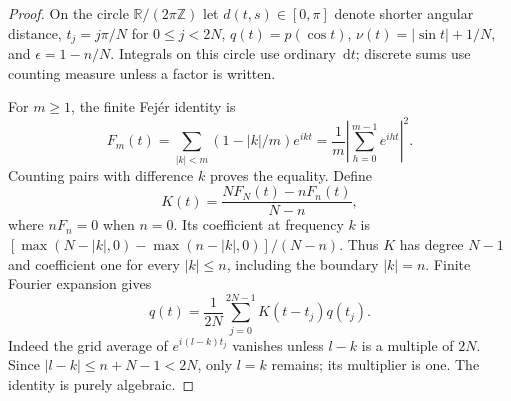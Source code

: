 \documentclass{siamart251216}
\newcommand{\R}{\mathbb R}
\newcommand{\dd}{\,\mathrm d}
\begin{document}
\begin{proof}
On the circle $\R/(2\pi\mathbb Z)$ let $d(t,s)\in[0,\pi]$ denote
shorter angular distance, $t_j=j\pi/N$ for $0\le j<2N$,
$q(t)=p(\cos t)$, $\nu(t)=|\sin t|+1/N$, and $\epsilon=1-n/N$.
Integrals on this circle use ordinary $\dd t$; discrete sums use counting
measure unless a factor is written.

For $m\ge1$, the finite Fej\'er identity is
\[
 F_m(t)=\sum_{|k|<m}(1-|k|/m)e^{ikt}
       =\frac1m\left|\sum_{h=0}^{m-1}e^{iht}\right|^2.
\]
Counting pairs with difference $k$ proves the equality. Define
\begin{equation}\label{eq:filter}
 K(t)=\frac{NF_N(t)-nF_n(t)}{N-n},
\end{equation}
where $nF_n=0$ when $n=0$. Its coefficient at frequency $k$ is
$[\max(N-|k|,0)-\max(n-|k|,0)]/(N-n)$.
Thus $K$ has degree $N-1$ and coefficient one for every $|k|\le n$,
including the boundary $|k|=n$. Finite Fourier expansion gives
\begin{equation}\label{eq:reconstruction}
 q(t)=\frac1{2N}\sum_{j=0}^{2N-1}K(t-t_j)q(t_j).
\end{equation}
Indeed the grid average of $e^{i(l-k)t_j}$ vanishes unless $l-k$ is
a multiple of $2N$. Since $|l-k|\le n+N-1<2N$, only $l=k$ remains;
its multiplier is one. The identity is purely algebraic.


\end{proof}
\end{document}
